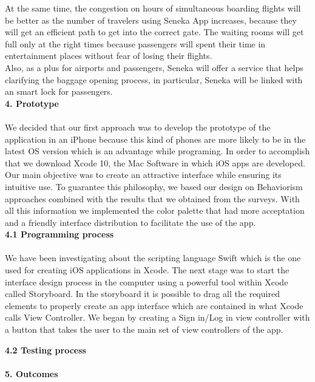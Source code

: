 \documentclass[]{article}
\begin{document}
At the same time, the congestion on hours of simultaneous boarding flights will be better as the number of travelers using Seneka App increases, because they will get an efficient path to get into the correct gate. The waiting rooms will get full only at the right times because passengers will spent their time in entertainment places without fear of losing their flights.\\

Also, as a plus for airports and passengers, Seneka will offer a service that helps clarifying the baggage opening process, in particular, Seneka will be linked with an smart lock for passengers.\\  

\Large{\textbf{4. Prototype}\\}\\

We decided that our first approach was to develop the prototype of the application in an iPhone because this kind of phones are more likely to be in the latest OS version which is an advantage while programing. In order to accomplish that we download Xcode 10, the Mac Software in which iOS apps are developed. Our main objective was to create an attractive interface while ensuring its intuitive use. To guarantee this philosophy, we based our design on Behaviorism approaches combined with the results that we obtained from the surveys. With all this information we implemented the color palette that had more acceptation and a friendly interface distribution to facilitate the use of the app. \\

\Large{\textbf{4.1 Programming process}\\}\\

We have been investigating about the scripting language Swift which is the one used for creating iOS applications in Xcode. The next stage was to start the interface design process in the computer using a powerful tool within Xcode called Storyboard. In the storyboard it is possible to drag all the required elements to properly create an app interface which are contained in what Xcode calls View Controller. We began by creating a Sign in/Log in view controller with a button that takes the user to the main set of view controllers of the app. 

\Large{\textbf{4.2 Testing process}\\}\\


\Large{\textbf{5. Outcomes}\\}\\
\end{document}
